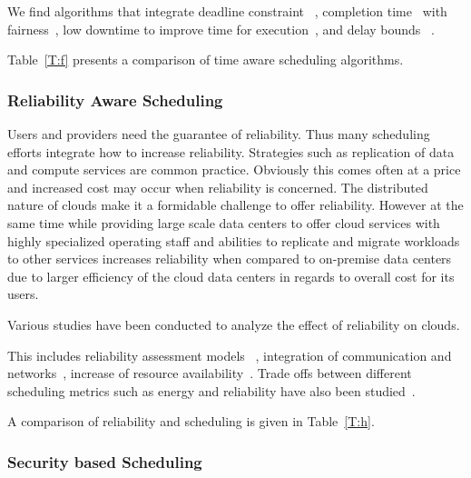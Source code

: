 \documentclass[final,5p,times,twocolumn]{elsarticle}
\begin{document}
We find algorithms that integrate
deadline constraint ~\cite{li2016energy}, 
completion time~\cite{xu2011job} with fairness~\cite{jasso1989theory}, 
low downtime to improve time for execution~\cite{frincu2014scheduling},
and 
delay bounds 
~\cite{yuan2018time}.

Table~\ref{T:f} presents a comparison of time aware
scheduling algorithms.



\subsubsection{Reliability Aware Scheduling}\label{sec:reliability}



Users and providers need the guarantee of reliability. Thus many
scheduling efforts integrate how to increase reliability. Strategies
such as replication of data and compute services are common
practice. Obviously this comes often at a price and increased cost may
occur when reliability is concerned. The distributed nature of clouds
make it a formidable challenge to offer reliability. However at the
same time while providing large scale data centers to offer cloud
services with highly specialized operating staff and abilities to
replicate and migrate workloads to other services increases
reliability when compared to on-premise data centers due to larger
efficiency of the cloud data centers in regards to overall cost for
its users.

Various studies have been conducted to analyze the effect of reliability on clouds.

This includes reliability assessment models
~\cite{malik2012reliability}, integration of communication and
networks~\cite{jing2015reliability}, increase of resource
availability~\cite{latiff2016fault}. Trade offs between different
scheduling metrics such as energy and reliability have also been
studied~\cite{tang2016energy}.

A comparison of reliability and scheduling is given in Table~\ref{T:h}.





\subsubsection{Security based Scheduling}\label{sec:security}
\end{document}
